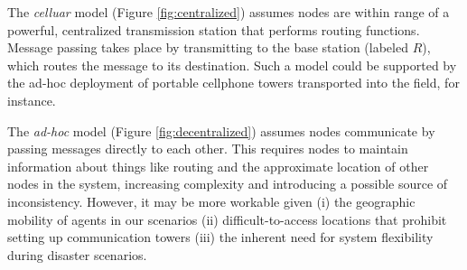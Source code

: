 \documentclass[]             %
{NASA}                       %
\theoremstyle{definition}
\begin{document}
The \emph{celluar} model (Figure \ref{fig:centralized}) assumes nodes
are within range of a powerful, centralized transmission station that
performs routing functions. Message passing takes place by transmitting
to the base station (labeled \(R\)), which routes the message to its
destination. Such a model could be supported by the ad-hoc deployment of
portable cellphone towers transported into the field, for instance.

The \emph{ad-hoc} model (Figure \ref{fig:decentralized}) assumes nodes
communicate by passing messages directly to each other. This requires
nodes to maintain information about things like routing and the
approximate location of other nodes in the system, increasing complexity
and introducing a possible source of inconsistency. However, it may be
more workable given (i) the geographic mobility of agents in our
scenarios (ii) difficult-to-access locations that prohibit setting up
communication towers (iii) the inherent need for system flexibility
during disaster scenarios.
\end{document}
